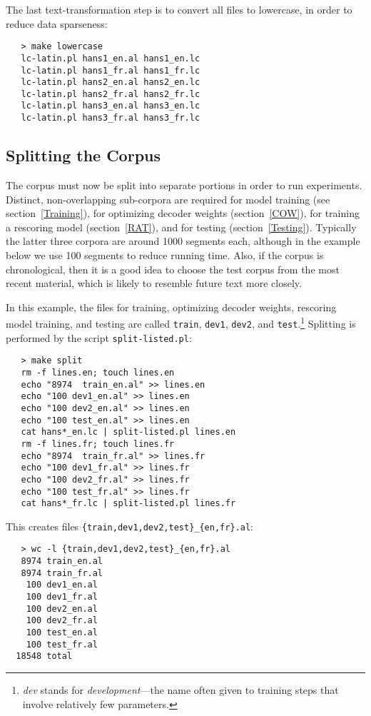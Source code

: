 \documentclass[11pt]{article}
\begin{document}
The last text-transformation step is to convert all files to lowercase, in
order to reduce data sparseness:
\begin{verbatim}
   > make lowercase
   lc-latin.pl hans1_en.al hans1_en.lc
   lc-latin.pl hans1_fr.al hans1_fr.lc
   lc-latin.pl hans2_en.al hans2_en.lc
   lc-latin.pl hans2_fr.al hans2_fr.lc
   lc-latin.pl hans3_en.al hans3_en.lc
   lc-latin.pl hans3_fr.al hans3_fr.lc
\end{verbatim}

\subsection{Splitting the Corpus} \label{Splitting}

The corpus must now be split into separate portions in order to run
experiments. Distinct, non-overlapping sub-corpora are required for model
training (see section~\ref{Training}), for optimizing decoder weights
(section~\ref{COW}), for training a rescoring model (section~\ref{RAT}), and
for testing (section~\ref{Testing}). Typically the latter three corpora are
around 1000 segments each, although in the example below we use 100 segments to
reduce running time. Also, if the corpus is chronological, then it is a good
idea to choose the test corpus from the most recent material, which is
likely to resemble future text more closely.

In this example, the files for training, optimizing decoder weights, rescoring
model training, and testing are called {\tt train}, {\tt dev1}, {\tt dev2}, and
{\tt test}.\footnote{{\em dev} stands for {\em development}---the name
often given to training steps that involve relatively few parameters.}
Splitting is performed by the script {\tt split-listed.pl}:
\begin{verbatim}
   > make split
   rm -f lines.en; touch lines.en
   echo "8974  train_en.al" >> lines.en
   echo "100 dev1_en.al" >> lines.en
   echo "100 dev2_en.al" >> lines.en
   echo "100 test_en.al" >> lines.en
   cat hans*_en.lc | split-listed.pl lines.en
   rm -f lines.fr; touch lines.fr
   echo "8974  train_fr.al" >> lines.fr
   echo "100 dev1_fr.al" >> lines.fr
   echo "100 dev2_fr.al" >> lines.fr
   echo "100 test_fr.al" >> lines.fr
   cat hans*_fr.lc | split-listed.pl lines.fr
\end{verbatim}
This creates files {\tt \{train,dev1,dev2,test\}\_\{en,fr\}.al}:
\begin{verbatim}
   > wc -l {train,dev1,dev2,test}_{en,fr}.al
   8974 train_en.al
   8974 train_fr.al
    100 dev1_en.al
    100 dev1_fr.al
    100 dev2_en.al
    100 dev2_fr.al
    100 test_en.al
    100 test_fr.al
  18548 total

\end{verbatim}
\end{document}
